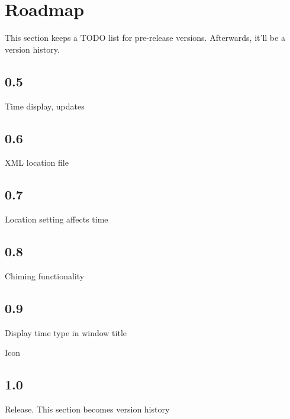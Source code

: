 \section{Roadmap}

This section keeps a TODO list for pre-release versions. Afterwards, it'll be a version history.



\subsection{0.5}

Time display, updates

\subsection{0.6}

XML location file

\subsection{0.7}

Location setting affects time

\subsection{0.8}

Chiming functionality

\subsection{0.9}

Display time type in window title

Icon

\subsection{1.0}

Release. This section becomes version history

